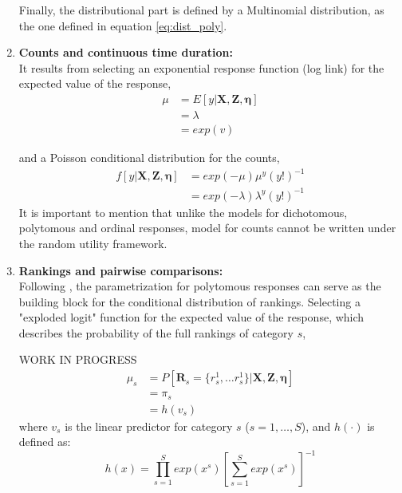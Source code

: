 \begin{enumerate}
	Finally, the distributional part is defined by a Multinomial distribution, as the one defined in equation \ref{eq:dist_poly}.
	
	
	
	\item \textbf{Counts and continuous time duration:} \\
	It results from selecting an exponential response function (log link) for the expected value of the response,
	\begin{equation} \label{eq:link_count}
		\begin{split}
		\mu &= E[y | \mathbf{X}, \mathbf{Z}, \pmb{\eta}] \\
		&= \lambda \\
		&= exp(v)
		\end{split}
	\end{equation}
	
	and a Poisson conditional distribution for the counts,
	\begin{equation} \label{eq:dist_count}
		\begin{split}
		f[y| \mathbf{X}, \mathbf{Z}, \pmb{\eta}] &= exp(-\mu) \mu^{y} (y!)^{-1} \\
		&= exp(-\lambda) \lambda^{y} (y!)^{-1}
		\end{split}
	\end{equation}
	It is important to mention that unlike the models for dichotomous, polytomous and ordinal responses, model for counts cannot be written under the random utility framework.
	
	
	
	\item \textbf{Rankings and pairwise comparisons:} \\
	Following \citet{Skrondal_et_al_2003a}, the parametrization for polytomous responses can serve as the building block for the conditional distribution of rankings. Selecting a "exploded logit" function \citep{Chapaaan_et_al_1982} for the expected value of the response, which describes the probability of the full rankings of category $s$,
	
	{\color{red} WORK IN PROGRESS
	\begin{equation} \label{eq:link_rank}
		\begin{split}
			\mu_{s} &= P[\mathbf{R}_{s}= \{ r_{s}^{1}, \dots r_{s}^{1}\} | \mathbf{X}, \mathbf{Z}, \pmb{\eta}] \\
			& = \pi_{s} \\
			&= h(v_{s})
		\end{split}
	\end{equation}	
	where $v_{s}$ is the linear predictor for category $s$ ($s=1, \dots, S$), and $h(\cdot)$ is defined as:
	\begin{equation} \label{eq:response_rank}
		h(x) = \prod_{s=1}^{S} exp(x^{s})\left[\sum_{s=1}^{S} exp(x^{s})\right]^{-1}
	\end{equation}

}
\end{enumerate}
